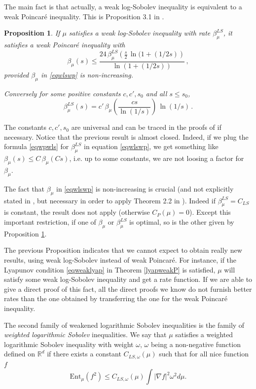 \documentclass[11pt,reqno]{amsart}
\numberwithin{equation}{section}
\newtheorem{proposition}[theorem]{Proposition}
\theoremstyle{definition}
\theoremstyle{remark}
\def \Ent {\textrm{Ent}}
\begin{document}
The main fact is that actually, a weak log-Sobolev inequality is equivalent to a weak Poincar\'e inequality. This is Proposition 3.1 in \cite{CGG}.
\begin{proposition}\label{propcgg1}
If $\mu$ satisfies a weak log-Sobolev inequality with rate $\beta_\mu^{LS}$, it satisfies a weak Poincar\'e inequality with 
\begin{equation}\label{eqwlswp}
\beta_\mu(s) \leq \frac{24 \, \beta_\mu^{LS}\left(\frac s2 \, \ln(1+(1/2s)\right)}{\ln (1+(1/2s))} \, ,
\end{equation}
provided $\beta_\mu$ in \eqref{eqwlswp} is non-increasing.

Conversely for some positive constants $c,c',s_0$ and all $s \leq s_0$, 
\begin{equation}\label{eqwpwls}
\beta_\mu^{LS}(s) = c' \, \beta_\mu\left(\frac{cs}{\ln (1/s)}\right) \, \ln(1/s) \, . 
\end{equation}
\end{proposition}
The constants $c,c',s_0$ are universal and can be traced in the proofs of \cite{CGG} if necessary. Notice that the previous result is almost closed. Indeed, if we plug the formula \eqref{eqwpwls} for $\beta_\mu^{LS}$ in equation \eqref{eqwlswp}, we get something like $\beta_\mu(s) \leq C \, \beta_\mu( Cs)$, i.e. up to some constants, we are not loosing a factor for $\beta_\mu$. 

The fact that $\beta_\mu$ in \eqref{eqwlswp} is non-increasing is crucial (and not explicitly stated in \cite{CGG}, but necessary in order to apply Theorem 2.2 in \cite{BCR2}). Indeed if $\beta_\mu^{LS}=C_{LS}$ is constant, the result does not apply (otherwise $C_P(\mu)=0$). Except this important restriction, if one of $\beta_\mu$ or $\beta_\mu^{LS}$ is optimal, so is the other given by Proposition \ref{propcgg1}. 


The previous Proposition indicates that we cannot expect to obtain really new results, using weak log-Sobolev instead of weak Poincar\'e. For instance, if the Lyapunov condition \eqref{eqweaklyap} in Theorem \ref{lyapweakP} is satisfied, $\mu$ will satisfy some weak log-Sobolev inequality and get a rate function. If we are able to give a direct proof of this fact, all the direct proofs we know do not furnish better rates than the one obtained by transferring the one for the weak Poincar\'e inequality.


The second family of weakened logarithmic Sobolev inequalities is the
family of \emph{weighted logarithmic Sobolev} inequalities.
We say that $\mu$ satisfies a weighted logarithmic Sobolev inequality with weight $\omega$, $\omega$ being a non-negative function defined on $\mathbb{R}^d$ if there exists a constant $C_{LS,\omega}(\mu)$ such that for all nice function $f$
\begin{equation}\label{eqweightLS}
    \Ent_\mu(f^2)\le C_{LS, \omega}(\mu)\int \vert \nabla f\vert^2\omega^2 d\mu.
\end{equation}
\end{document}
